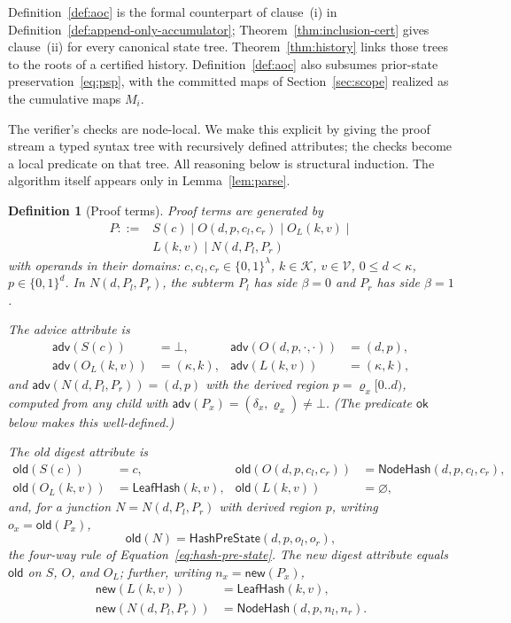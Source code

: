 \documentclass[11pt]{article}
\newtheorem{definition}{Definition}
\begin{document}
Definition~\ref{def:aoc} is the formal counterpart of clause~(i) in Definition~\ref{def:append-only-accumulator}; Theorem~\ref{thm:inclusion-cert} gives clause~(ii) for every canonical state tree. Theorem~\ref{thm:history} links those trees to the roots of a certified history. Definition~\ref{def:aoc} also subsumes prior-state preservation~\eqref{eq:psp}, with the committed maps of Section~\ref{sec:scope} realized as the cumulative maps $M_i$.

The verifier's checks are node-local. We make this explicit by giving the proof stream a typed syntax tree with recursively defined attributes; the checks become a local predicate on that tree. All reasoning below is structural induction. The algorithm itself appears only in Lemma~\ref{lem:parse}.

\begin{definition}[Proof terms]
\label{def:pterm}
Proof terms are generated by
\begin{align*}
P ::={} & S(c) \mid O(d, p, c_l, c_r) \mid O_L(k, v) \mid{}\\
        & L(k, v) \mid N(d, P_l, P_r)
\end{align*}
with operands in their domains: $c, c_l, c_r \in \{0,1\}^{\lambda}$, $k \in \mathcal{K}$, $v \in \mathcal{V}$, $0 \le d < \kappa$, $p \in \{0,1\}^{d}$. In $N(d, P_l, P_r)$, the subterm $P_l$ has side $\beta = 0$ and $P_r$ has side $\beta = 1$.

The \emph{advice} attribute is
\begin{align*}
\mathsf{adv}(S(c)) &= \bot, & \mathsf{adv}(O(d,p,\cdot,\cdot)) &= (d, p),\\
\mathsf{adv}(O_L(k,v)) &= (\kappa, k), & \mathsf{adv}(L(k,v)) &= (\kappa, k),
\end{align*}
and $\mathsf{adv}(N(d, P_l, P_r)) = (d, p)$ with the \emph{derived region} $p = \varrho_x[0..d)$, computed from any child with $\mathsf{adv}(P_x) = (\delta_x, \varrho_x) \neq \bot$. (The predicate $\mathsf{ok}$ below makes this well-defined.)

The \emph{old digest} attribute is
\begin{align*}
\mathsf{old}(S(c)) &= c, &
\mathsf{old}(O(d,p,c_l,c_r)) &= \mathsf{NodeHash}(d,p,c_l,c_r),\\
\mathsf{old}(O_L(k,v)) &= \mathsf{LeafHash}(k,v), &
\mathsf{old}(L(k,v)) &= \varnothing,
\end{align*}
and, for a junction $N = N(d, P_l, P_r)$ with derived region $p$, writing $o_x = \mathsf{old}(P_x)$,
\[
\mathsf{old}(N) = \mathsf{HashPreState}(d,p,o_l,o_r),
\]
the \emph{four-way rule} of Equation~\eqref{eq:hash-pre-state}. The \emph{new digest} attribute equals $\mathsf{old}$ on $S$, $O$, and $O_L$; further, writing $n_x = \mathsf{new}(P_x)$,
\begin{align*}
\mathsf{new}(L(k,v)) &= \mathsf{LeafHash}(k,v),\\
\mathsf{new}(N(d,P_l,P_r)) &= \mathsf{NodeHash}(d,p,n_l,n_r).
\end{align*}


\end{definition}
\end{document}
